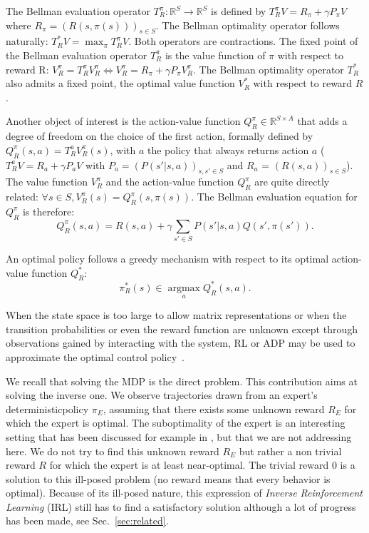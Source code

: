 \documentclass{llncs}
\newcommand{\argmax}{\operatorname*{argmax}} %
\begin{document}
The Bellman evaluation operator $T^\pi_R: \mathbb{R}^{S} \rightarrow  \mathbb{R}^{S}$ is defined by
$  T^{\pi}_RV = R_\pi + \gamma P_\pi V$
where $R_\pi = (R(s,\pi(s)))_{s\in S}$. The Bellman optimality operator follows naturally:
 $ T^*_RV = \max_\pi T^\pi_RV$.
  Both operators are contractions. The fixed point of the Bellman evaluation operator $T^\pi_R$ is the value function of $\pi$ with respect to reward R:
    $V^\pi_R = T^\pi_R V^\pi_R \Leftrightarrow V^\pi_R = R_\pi + \gamma P_\pi V^\pi_R$.
The Bellman optimality operator $T^*_R$ also admits a fixed point, the optimal value function $V_R^*$ with respect to reward $R$.

Another object of interest is the action-value function $Q^\pi_R\in\mathbb{R}^{S\times A}$ that adds a degree of freedom on the choice of the first action, formally defined by $Q^\pi_R(s,a) = T^a_RV^\pi_R(s)$, with $a$ the policy that always returns action $a$ ($T^a_RV = R_a + \gamma P_a V$ with $P_a = (P(s'|s,a))_{s,s' \in S}$ and $R_a$ = $(R(s,a))_{s\in S}$). The value function $V^\pi_R$ and the action-value function $Q^\pi_R$ are quite directly related: $\forall s \in S, V^\pi_R(s) = Q^\pi_R(s,\pi(s))$. The Bellman evaluation equation for $Q^\pi_R$ is therefore:
\begin{equation}
  Q^\pi_R(s,a) = R(s,a) + \gamma \sum_{s'\in S}P(s'|s,a) Q(s',\pi(s')).
  \label{eq:bellman1}
\end{equation}

An optimal policy follows a greedy mechanism with respect to its optimal action-value function $Q^*_R$:
\begin{equation}
  \label{eq:greedy}
  \pi^*_R(s)\in\argmax_aQ^*_R(s,a).
\end{equation}

When the state space is too large to allow matrix representations or when the transition probabilities or even the reward function are unknown except through observations gained by interacting with the system, RL or ADP may be used to approximate the optimal control policy~\cite{sutton1998reinforcement}.

We recall that solving the MDP is the direct problem. This contribution aims at solving the inverse one. We observe trajectories drawn from an expert's deterministic\footnotemark[\value{footnote}] policy $\pi_E$, assuming that there exists some unknown reward $R_E$ for which the expert is optimal. The suboptimality of the expert is an interesting setting that has been discussed for example in \cite{melo2010analysis,syed2010reduction}, but that we are not addressing here. We do not try to find this unknown reward $R_E$ but rather a non trivial reward $R$ for which the expert is at least near-optimal. The trivial reward $0$ is a solution to this ill-posed problem (no reward means that every behavior is optimal). Because of its ill-posed nature, this expression of \emph{Inverse Reinforcement Learning} (IRL) still has to find a satisfactory solution although a lot of progress has been made, see Sec.~\ref{sec:related}.
\end{document}

